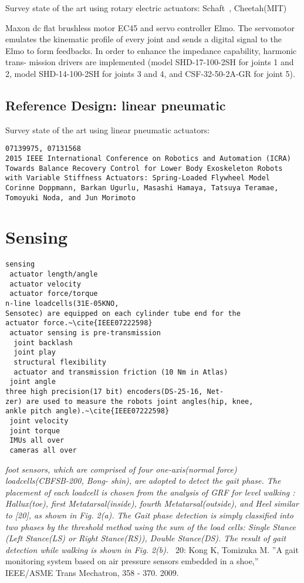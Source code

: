 \documentclass[letterpaper,12pt,fullpage]{article}
\begin{document}
Survey state of the art using rotary electric actuators:
Schaft~\cite{shaft_foot_placement,shaft_push_recov}, Cheetah(MIT)

Maxon dc flat brushless motor EC45 and servo controller
Elmo. The servomotor emulates the kinematic profile of every
joint and sends a digital signal to the Elmo to form feedbacks.
In order to enhance the impedance capability, harmonic trans-
mission drivers are implemented (model SHD-17-100-2SH
for joints 1 and 2, model SHD-14-100-2SH for joints 3 and 4,
and CSF-32-50-2A-GR for joint 5).~\cite{IEEE07128705}

\subsection{Reference Design: linear pneumatic}

Survey state of the art using linear pneumatic actuators:

\begin{verbatim}
07139975, 07131568
2015 IEEE International Conference on Robotics and Automation (ICRA)
Towards Balance Recovery Control for Lower Body Exoskeleton Robots
with Variable Stiffness Actuators: Spring-Loaded Flywheel Model
Corinne Doppmann, Barkan Ugurlu, Masashi Hamaya, Tatsuya Teramae,
Tomoyuki Noda, and Jun Morimoto
\end{verbatim}

\section{Sensing}

\begin{verbatim}
sensing
 actuator length/angle
 actuator velocity
 actuator force/torque 
n-line loadcells(31E-05KNO,
Sensotec) are equipped on each cylinder tube end for the
actuator force.~\cite{IEEE07222598}
 actuator sensing is pre-transmission
  joint backlash
  joint play
  structural flexibility
  actuator and transmission friction (10 Nm in Atlas)
 joint angle
three high precision(17 bit) encoders(DS-25-16, Net-
zer) are used to measure the robots joint angles(hip, knee,
ankle pitch angle).~\cite{IEEE07222598}
 joint velocity
 joint torque
 IMUs all over
 cameras all over
\end{verbatim}

{\it foot sensors, which are comprised
of four one-axis(normal force) loadcells(CBFSB-200, Bong-
shin), are adopted to detect the gait phase. The placement
of each loadcell is chosen from the analysis of GRF for
level walking : Hallux(toe), first Metatarsal(inside), fourth
Metatarsal(outside), and Heel similar to [20], as shown in
Fig. 2(a). The Gait phase detection is simply classified
into two phases by the threshold method using the sum
of the load cells: Single Stance (Left Stance(LS) or Right
Stance(RS)), Double Stance(DS). The result of gait detection
while walking is shown in Fig. 2(b).}~\cite{IEEE07222598}
20: Kong K, Tomizuka M. ”A gait monitoring system based on air pressure
sensors embedded in a shoe,” IEEE/ASME Trans Mechatron, 358 - 370.
2009.
\end{document}
